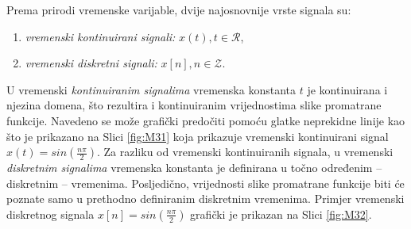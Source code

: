 \documentclass[a4paper,12pt,oneside]{memoir}
\begin{document}
            Prema prirodi vremenske varijable, dvije najosnovnije vrste signala su:
            \begin{enumerate}
                \item \textit{vremenski kontinuirani signali:} $x(t), t\in \mathcal{R}$,
                \item \textit{vremenski diskretni signali:} $x[n], n \in \mathcal{Z}$.
            \end{enumerate}

            U vremenski \textit{kontinuiranim signalima} vremenska konstanta $t$ je kontinuirana i njezina domena, što rezultira i kontinuiranim vrijednostima slike promatrane funkcije. Navedeno se može grafički predočiti pomoću glatke neprekidne linije kao što je prikazano na Slici \ref{fig:M31} koja prikazuje vremenski kontinuirani signal $x(t)=sin(\frac{n\pi}{2})$. Za razliku od vremenski kontinuiranih signala, u vremenski \textit{diskretnim signalima} vremenska konstanta je definirana u točno određenim -- diskretnim -- vremenima. Posljedično, vrijednosti slike promatrane funkcije biti će poznate samo u prethodno definiranim diskretnim vremenima. Primjer vremenski diskretnog signala $x[n]=sin(\frac{n\pi}{2})$ grafički je prikazan na Slici \ref{fig:M32}.
\end{document}
